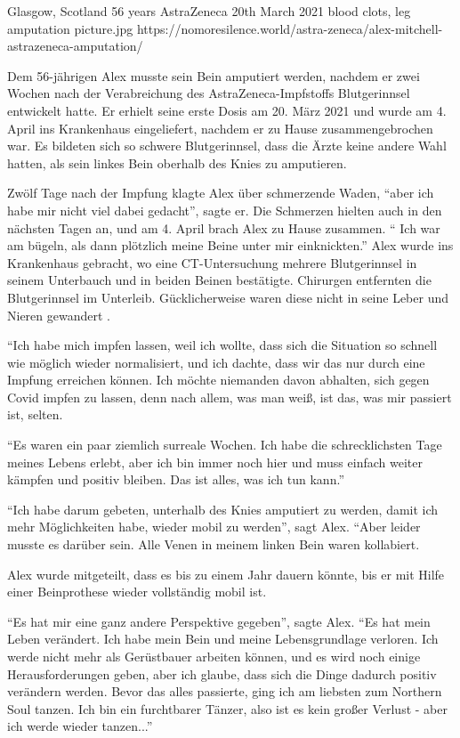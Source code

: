           {Glasgow, Scotland}
          {56 years}
          {AstraZeneca}
          {20th March 2021}
          {blood clots, leg amputation}
          {picture.jpg}
          {https://nomoresilence.world/astra-zeneca/alex-mitchell-astrazeneca-amputation/}
          {

Dem 56-jährigen Alex musste sein Bein amputiert werden, nachdem er zwei Wochen
nach der Verabreichung des AstraZeneca-Impfstoffs Blutgerinnsel entwickelt
hatte. Er erhielt seine erste Dosis am 20. März 2021 und wurde am 4. April ins
Krankenhaus eingeliefert, nachdem er zu Hause zusammengebrochen war. Es bildeten
sich so schwere Blutgerinnsel, dass die Ärzte keine andere Wahl hatten, als sein
linkes Bein oberhalb des Knies zu amputieren.

Zwölf Tage nach der Impfung klagte Alex über schmerzende Waden, ``aber ich habe
mir nicht viel dabei gedacht'', sagte er. Die Schmerzen hielten auch in den
nächsten Tagen an, und am 4. April brach Alex zu Hause zusammen. `` Ich war am
bügeln, als dann plötzlich meine Beine unter mir einknickten.'' Alex wurde ins
Krankenhaus gebracht, wo eine CT-Untersuchung mehrere Blutgerinnsel in seinem
Unterbauch und in beiden Beinen bestätigte. Chirurgen entfernten die
Blutgerinnsel im Unterleib. Gücklicherweise waren diese nicht in seine Leber und
Nieren gewandert .

``Ich habe mich impfen lassen, weil ich wollte, dass sich die Situation so
schnell wie möglich wieder normalisiert, und ich dachte, dass wir das nur durch
eine Impfung erreichen können. Ich möchte niemanden davon abhalten, sich gegen
Covid impfen zu lassen, denn nach allem, was man weiß, ist das, was mir passiert
ist, selten.

``Es waren ein paar ziemlich surreale Wochen. Ich habe die schrecklichsten Tage
meines Lebens erlebt, aber ich bin immer noch hier und muss einfach weiter
kämpfen und positiv bleiben. Das ist alles, was ich tun kann.''

``Ich habe darum gebeten, unterhalb des Knies amputiert zu werden, damit ich
mehr Möglichkeiten habe, wieder mobil zu werden'', sagt Alex. ``Aber leider
musste es darüber sein. Alle Venen in meinem linken Bein waren kollabiert.

Alex wurde mitgeteilt, dass es bis zu einem Jahr dauern könnte, bis er mit Hilfe einer Beinprothese wieder vollständig mobil ist.

``Es hat mir eine ganz andere Perspektive gegeben'', sagte Alex. ``Es hat mein
Leben verändert. Ich habe mein Bein und meine Lebensgrundlage verloren. Ich
werde nicht mehr als Gerüstbauer arbeiten können, und es wird noch einige
Herausforderungen geben, aber ich glaube, dass sich die Dinge dadurch positiv
verändern werden. Bevor das alles passierte, ging ich am liebsten zum Northern
Soul tanzen. Ich bin ein furchtbarer Tänzer, also ist es kein großer Verlust -
aber ich werde wieder tanzen...''

}
